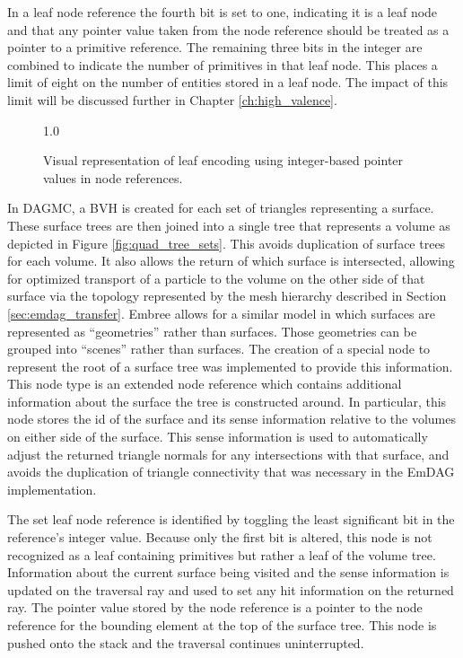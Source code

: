In a leaf node reference the fourth bit is set to one, indicating it is a leaf
node and that any pointer value taken from the node reference should be treated
as a pointer to a primitive reference. The remaining three bits in the integer are
combined to indicate the number of primitives in that leaf node. This places a
limit of eight on the number of entities stored in a leaf node. The impact of
this limit will be discussed further in Chapter \ref{ch:high_valence}.

\begin{figure}[H]
  \centering
  {1.0\textwidth}
  \caption{Visual representation of leaf encoding using integer-based
    pointer values in node references.}
  \label{fig:leaf_encoding}
\end{figure}

In DAGMC, a BVH is created for each set of triangles representing a
surface. These surface trees are then joined into a single tree that represents
a volume as depicted in Figure \ref{fig:quad_tree_sets}. This avoids duplication
of surface trees for each volume. It also allows the return of which surface is
intersected, allowing for optimized transport of a particle to the volume on the
other side of that surface via the topology represented by the mesh hierarchy
described in Section \ref{sec:emdag_transfer}. Embree allows for a similar model
in which surfaces are represented as ``geometries'' rather than surfaces. Those
geometries can be grouped into ``scenes'' rather than surfaces.  The creation of
a special node to represent the root of a surface tree was implemented to
provide this information. This node type is an extended node reference which
contains additional information about the surface the tree is constructed
around. In particular, this node stores the id of the surface and its sense
information relative to the volumes on either side of the surface. This sense
information is used to automatically adjust the returned triangle normals for
any intersections with that surface, and avoids the duplication of triangle
connectivity that was necessary in the EmDAG implementation.

The set leaf node reference is identified by toggling the least significant bit in
the reference's integer value. Because only the first bit is altered, this node
is not recognized as a leaf containing primitives but rather a leaf of the
volume tree. Information about the current surface being visited and the sense
information is updated on the traversal ray and used to set any hit information
on the returned ray. The pointer value stored by the node reference is a pointer
to the node reference for the bounding element at the top of the
surface tree. This node is pushed onto the stack and the traversal continues
uninterrupted.

